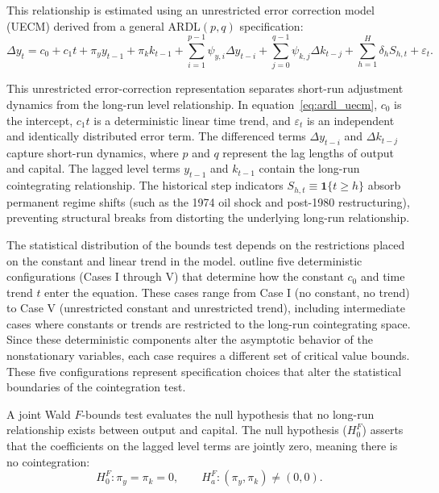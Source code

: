 This relationship is estimated using an unrestricted error correction model (UECM) derived from a general $\text{ARDL}(p, q)$ specification:
\begin{equation}
\Delta y_t = c_0 + c_1 t + \pi_y y_{t-1} + \pi_k k_{t-1} + \sum_{i=1}^{p-1} \psi_{y,i} \Delta y_{t-i} + \sum_{j=0}^{q-1} \psi_{k,j} \Delta k_{t-j} + \sum_{h=1}^{H} \delta_h S_{h,t} + \varepsilon_t .
\label{eq:ardl_uecm}
\end{equation}

This unrestricted error-correction representation separates short-run adjustment dynamics from the long-run level relationship. In equation~\eqref{eq:ardl_uecm}, $c_0$ is the intercept, $c_1 t$ is a deterministic linear time trend, and $\varepsilon_t$ is an independent and identically distributed error term. The differenced terms $\Delta y_{t-i}$ and $\Delta k_{t-j}$ capture short-run dynamics, where $p$ and $q$ represent the lag lengths of output and capital. The lagged level terms $y_{t-1}$ and $k_{t-1}$ contain the long-run cointegrating relationship. The historical step indicators $S_{h,t} \equiv \mathbf{1}\{t \ge h\}$ absorb permanent regime shifts (such as the 1974 oil shock and post-1980 restructuring), preventing structural breaks from distorting the underlying long-run relationship.

The statistical distribution of the bounds test depends on the restrictions placed on the constant and linear trend in the model. \citet{Pesaran2001} outline five deterministic configurations (Cases I through V) that determine how the constant $c_0$ and time trend $t$ enter the equation. These cases range from Case I (no constant, no trend) to Case V (unrestricted constant and unrestricted trend), including intermediate cases where constants or trends are restricted to the long-run cointegrating space. Since these deterministic components alter the asymptotic behavior of the nonstationary variables, each case requires a different set of critical value bounds. These five configurations represent specification choices that alter the statistical boundaries of the cointegration test.

\pagebreak
A joint Wald $F$-bounds test evaluates the null hypothesis that no long-run relationship exists between output and capital. The null hypothesis ($H_0^F$) asserts that the coefficients on the lagged level terms are jointly zero, meaning there is no cointegration:
\begin{equation}
H_{0}^{F}: \pi_y=\pi_k=0, \qquad H_{a}^{F}: (\pi_y,\pi_k)\neq(0,0).
\label{eq:fbounds_hypothesis}
\end{equation}

